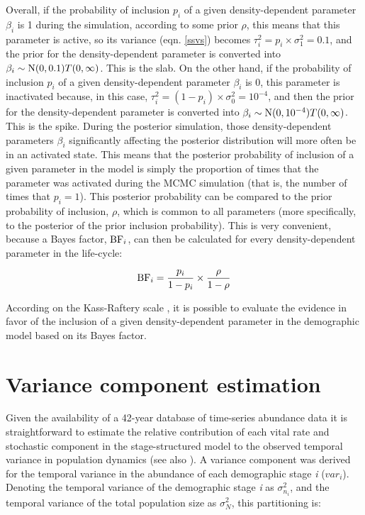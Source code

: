 \documentclass[12pt,a4paper]{article}
\begin{document}
Overall, if the probability of inclusion $p_{i}$ of a given density-dependent parameter $\beta_{i}$ is 1 during the simulation, according to some prior $\rho$, this means that this parameter is active, so its variance (eqn. \ref{ssvs}) becomes $\tau_{i}^2 = p_{i} \times \sigma_{1}^2 = 0.1$, and the prior for the density-dependent parameter is converted into $\beta_{i} \sim \textnormal{N}(0, 0.1)T(0,\infty)$. This is the slab. On the other hand, if the probability of inclusion $p_{i}$ of a given density-dependent parameter $\beta_{i}$ is 0, this parameter is inactivated because, in this case, $\tau_{i}^2 = (1 - p_{i}) \times \sigma_{0}^2 = 10^{-4}$, and then the prior for the density-dependent parameter is converted into $\beta_{i} \sim \textnormal{N}(0, 10^{-4})T(0,\infty)$. This is the spike. During the posterior simulation, those density-dependent parameters $\beta_{i}$ significantly affecting the posterior distribution will more often be in an activated state. This means that the posterior probability of inclusion of a given parameter in the model is simply the proportion of times that the parameter was activated during the MCMC simulation (that is, the number of times that $p_{i} = 1$). This posterior probability can be compared to the prior probability of inclusion, $\rho$, which is common to all parameters (more specifically, to the posterior of the prior inclusion probability). This is very convenient, because a Bayes factor, $\textnormal{BF}_{i}$, \cite{Kass1995,Almaraz2011,Mutshinda2011} can then be calculated for every density-dependent parameter in the life-cycle:

\begin{equation}
	\textnormal{BF}_{i} =  \frac{p_{i}}{1-p_{i}} \times \frac{\rho}{1-\rho}
\end{equation}

According on the Kass-Raftery scale \cite{Kass1995}, it is possible to evaluate the evidence in favor of the inclusion of a given density-dependent parameter in the demographic model based on its Bayes factor.\\

\section{Variance component estimation}

Given the availability of a 42-year database of time-series abundance data it is straightforward to estimate the relative contribution of each vital rate and stochastic component in the stage-structured model to the observed temporal variance in population dynamics (see also \cite{Almaraz2011,Mutshinda2011}). A variance component was derived for the temporal variance in the abundance of each demographic stage \textit{i} ($var_{i}$). Denoting the temporal variance of the demographic stage \textit{i} as $\sigma^2_{n_{i}}$, and the temporal variance of the total population size as $\sigma^2_{N}$, this partitioning is:
\end{document}

